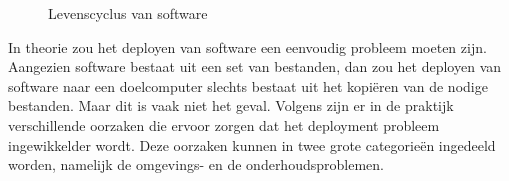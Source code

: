 \begin{figure}[!ht]
\centering
{}
\caption{Levenscyclus van software \citep{carzaniga1998characterization}}
\label{fig:softwareLevenscyclus}
\end{figure}

In theorie zou het deployen van software een eenvoudig probleem moeten zijn.
Aangezien software bestaat uit een set van bestanden, dan zou het deployen van software naar een doelcomputer slechts bestaat uit het kopiëren van de nodige bestanden.
Maar dit is vaak niet het geval.
Volgens \citet{dolstra2006purely} zijn er in de praktijk verschillende oorzaken die ervoor zorgen dat het deployment probleem ingewikkelder wordt.
Deze oorzaken kunnen in twee grote categorieën ingedeeld worden, namelijk de omgevings- en de onderhoudsproblemen.

